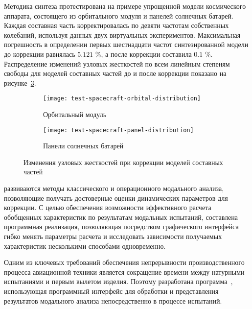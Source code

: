 Методика синтеза протестирована на примере упрощенной модели космического аппарата, состоящего из орбитального модуля и панелей солнечных батарей. Каждая составная часть корректировалась по девяти частотам собственных колебаний, используя данных двух виртуальных экспериментов. Максимальная погрешность в определении первых шестнадцати частот синтезированной модели до коррекции равнялась $ 5.121 $ \%, а после коррекции составила $ 0.1 $ \%. Распределение изменений узловых жесткостей по всем линейным степеням свободы для моделей составных частей до и после коррекции показано на рисунке~\ref{fig:test-spacecraft-distribution}. 

\begin{figure}[H]
	\centering
	\vspace{-1.5em}
	\begin{subfigure}[t]{0.46\textwidth}
		\centering
		\texttt{[image: test-spacecraft-orbital-distribution]}
		\caption{\small Орбитальный модуль} \label{subfig:test-orbital-distribution}
	\end{subfigure}
	\hfill
	\begin{subfigure}[t]{0.44\textwidth}
		\centering
		\texttt{[image: test-spacecraft-panel-distribution]}
		\caption{\small Панели солнечных батарей} \label{subfig:test-panel-distribution}
	\end{subfigure}
	\vspace{1em}
	\caption{Изменения узловых жесткостей при коррекции моделей составных частей} \label{fig:test-spacecraft-distribution} 
\end{figure}


 развиваются методы классического и операционного модального анализа, позволяющие получать достоверные оценки динамических параметров для коррекции. С целью обеспечения возможности эффективного расчета обобщенных характеристик по результатам модальных испытаний, составлена программная реализация, позволяющая посредством графического интерфейса~ гибко менять параметры расчета и исследовать зависимости получаемых характеристик несколькими способами одновременно. 

Одним из ключевых требований обеспечения непрерывности производственного процесса авиационной техники является сокращение времени между натурными испытаниями и первым вылетом изделия. Поэтому разработана программа~, использующая программный интерфейс  для обработки и представления результатов модального анализа непосредственно в процессе испытаний.

